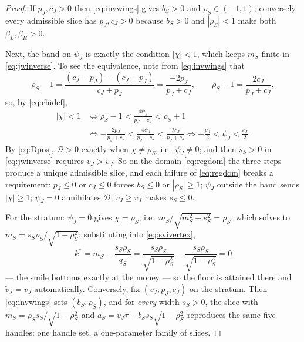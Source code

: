\begin{proof}
If $p_J,c_J>0$ then \eqref{eq:invwings} gives $b_S>0$ and
$\rho_S\in(-1,1)$; conversely every admissible slice has $p_J,c_J>0$
because $b_S>0$ and $|\rho_S|<1$ make both $\beta_L,\beta_R>0$.

Next, the band on $\psi_J$ is exactly the condition $|\chi|<1$, which
keeps $m_S$ finite in \eqref{eq:jwinverse}.  To see the equivalence,
note from \eqref{eq:invwings} that
\[
\rho_S-1=\frac{(c_J-p_J)-(c_J+p_J)}{c_J+p_J}=\frac{-2p_J}{p_J+c_J},
\qquad
\rho_S+1=\frac{2c_J}{p_J+c_J},
\]
so, by \eqref{eq:chidef},
\begin{align*}
|\chi|<1
&\iff \rho_S-1<\frac{4\psi_J}{p_J+c_J}<\rho_S+1\\
&\iff -\frac{2p_J}{p_J+c_J}<\frac{4\psi_J}{p_J+c_J}<\frac{2c_J}{p_J+c_J}
\iff -\frac{p_J}{2}<\psi_J<\frac{c_J}{2}.
\end{align*}
By \eqref{eq:Dpos}, $\mathcal{D}>0$ exactly when $\chi\ne\rho_S$,
i.e.\ $\psi_J\ne0$; and then $s_S>0$ in \eqref{eq:jwinverse} requires
$v_J>\tilde v_J$.  So on the domain \eqref{eq:regdom} the three steps
produce a unique admissible slice, and each failure of \eqref{eq:regdom}
breaks a requirement: $p_J\le0$ or $c_J\le0$ forces $b_S\le0$ or
$|\rho_S|\ge1$; $\psi_J$ outside the band sends $|\chi|\ge1$;
$\psi_J=0$ annihilates $\mathcal{D}$; $\tilde v_J\ge v_J$ makes
$s_S\le0$.

For the stratum: $\psi_J=0$ gives $\chi=\rho_S$, i.e.\
$m_S/\sqrt{m_S^2+s_S^2}=\rho_S$, which solves to
$m_S=s_S\rho_S/\sqrt{1-\rho_S^2}$; substituting into
\eqref{eq:svivertex},
\[
k^*=m_S-\frac{s_S\rho_S}{q_S}
=\frac{s_S\rho_S}{\sqrt{1-\rho_S^2}}-\frac{s_S\rho_S}{\sqrt{1-\rho_S^2}}
=0
\]
--- the smile bottoms exactly at the money --- so the floor is
attained there and $\tilde v_J=v_J$ automatically.  Conversely, fix $(v_J,p_J,c_J)$ on the
stratum.  Then \eqref{eq:invwings} sets $(b_S,\rho_S)$, and for
\emph{every} width $s_S>0$, the slice with
$m_S=\rho_S s_S/\sqrt{1-\rho_S^2}$ and
$a_S=v_J\tau-b_Ss_S\sqrt{1-\rho_S^2}$ reproduces the same five handles:
one handle set, a one-parameter family of slices.
\end{proof}

